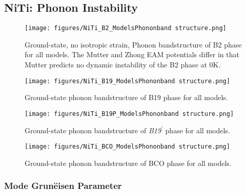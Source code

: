 \documentclass[preprint,colorlinks=true,linkcolor=black,citecolor=black]{elsarticle}
\begin{document}
\subsection{NiTi: Phonon Instability}
\label{subsec:nitiphonons}

\begin{figure}[!htp]
	\begin{centering}
		\texttt{[image: figures/NiTi\_B2\_ModelsPhononband
			structure.png]}
		\caption{ Ground-state, no isotropic strain, Phonon bandstructure
			of B2 phase for all models. The Mutter and Zhong EAM potentials
			differ in that Mutter predicts no dynamic instability of the B2
			phase at 0K.  }
		\label{fig:allmodels_b2}
	\end{centering}
\end{figure}

\begin{figure}[!htp]
	\begin{centering}
		\texttt{[image: figures/NiTi\_B19\_ModelsPhononband
			structure.png]}
		\caption{ Ground-state phonon bandstructure of B19 phase for all
			models.  }
		\label{fig:allmodels_B19P}
	\end{centering}
\end{figure}

\begin{figure}[!htp]
	\begin{centering}
		\texttt{[image: figures/NiTi\_B19P\_ModelsPhononband
			structure.png]}
		\caption{ Ground-state phonon bandstructure of
			\textit{B19}$^\prime$ phase for all models.  }
		\label{fig:allmodels_B19P}
	\end{centering}
\end{figure}

\begin{figure}[!htp]
	\begin{centering}
		\texttt{[image: figures/NiTi\_BCO\_ModelsPhononband
			structure.png]}
		\caption{ Ground-state phonon bandstructure of BCO phase for all
			models.  }
		\label{fig:allmodels_B19P}
	\end{centering}
\end{figure}

\subsubsection{Mode Grun\"{e}isen Parameter}
\end{document}
